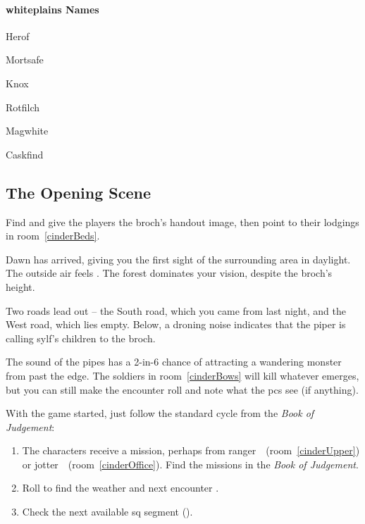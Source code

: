 \begin{multicols}{2}
\begin{multicols}{2}
\paragraph{\Gls{whiteplains} Names}

\begin{dlist}
  \item
  Herof
  \item
  Mortsafe
  \item
  Knox
  \item
  Rotfilch
  \item
  Magwhite
  \item
  Caskfind
\end{dlist}

\end{multicols}

\vspace{-4em}
\subsection{The Opening Scene}

Find   and give the players the \gls{broch}'s handout image, then point to their lodgings in room~\ref{cinderBeds}.

\begin{boxtext}
  Dawn has arrived, giving you the first sight of the surrounding area in daylight.
  The outside air feels \showTemperature.
  The forest dominates your vision, despite the \gls{broch}'s height.

  Two roads lead out -- the South road, which you came from last night, and the West road, which lies empty.
  Below, a droning noise indicates that the piper is calling \gls{sylf}'s children to the \gls{broch}.
\end{boxtext}

The sound of the pipes has a 2-in-6 chance of attracting a wandering \gls{monster} from past the \gls{edge}.
The \glspl{soldier} in room~\ref{cinderBows} will kill whatever emerges, but you can still make the encounter roll and note what the \glspl{pc} see (if anything).

With the game started, just follow the standard cycle from the \textit{Book of Judgement}:

\begin{enumerate}
  \item
  The characters receive a mission, perhaps from \Gls{ranger}~\composeHumanName\ (room~\ref{cinderUpper}) or \Gls{jotter}~\composeHumanName\ (room~\ref{cinderOffice}).
  Find the missions in the \textit{Book of Judgement}\iftoggle{judgement}{ (\autopageref{NGmissions})}{}.
  \item
  Roll to find the weather and next encounter \iftoggle{judgement}{(\textit{Book of Judgement}, pages \pageref{weather} and \pageref{randomEncounters})}{on the \gls{gm}-shield}.
  \item
  Check the next available \gls{sq} \gls{segment} ().
\end{enumerate}


\end{multicols}
